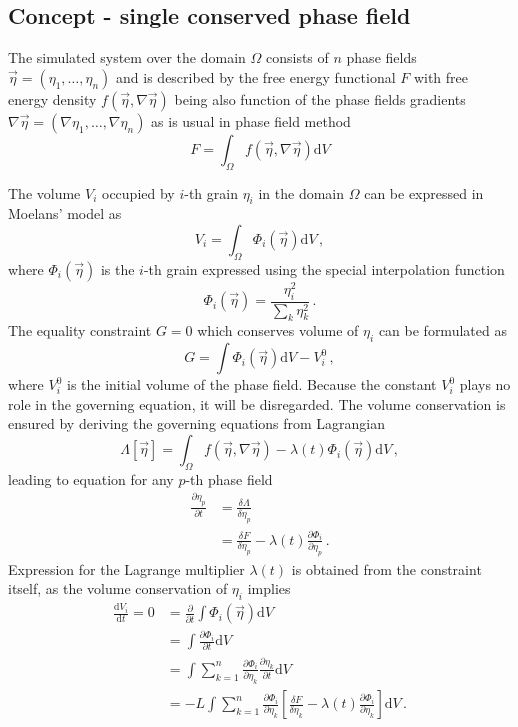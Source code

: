 \subsection*{Concept - single conserved phase field}
The simulated system over the domain $\Omega$ consists of $n$ phase fields $\vec{\eta}=(\eta_1,\dots,\eta_n)$ and is described by the free energy functional $F$ with free energy density $f(\vec{\eta},\nabla\vec{\eta})$ being also function of the phase fields gradients $\nabla\vec{\eta}=(\nabla\eta_1,\dots,\nabla\eta_n)$ as is usual in phase field method
\begin{equation}
	F= \int_\Omega f(\vec{\eta},\nabla\vec{\eta}) \mathrm{d}V    
\end{equation}

The volume $V_i$ occupied by $i$-th grain $\eta_i$ in the domain $\Omega$ can be expressed in Moelans' model as
\begin{equation}
	V_i = \int_\Omega \Phi_i(\vec{\eta}) \mathrm{d}V \,,
\end{equation}
where $\Phi_i(\vec{\eta})$ is the $i$-th grain expressed using the special interpolation function~\cite{Moelans2011}
\begin{equation}
	\Phi_i(\vec{\eta}) = \frac{\eta_i^2}{\sum_k\eta_k^2} \,.
\end{equation}
The equality constraint $G=0$ which conserves volume of $\eta_i$ can be formulated as
\begin{equation}
	G = \int \Phi_i(\vec{\eta}) \mathrm{d}V - V_i^0 \,,
\end{equation}
where $V_i^0$ is the initial volume of the phase field. Because the constant $V_i^0$ plays no role in the governing equation, it will be disregarded. The volume conservation is ensured by deriving the governing equations from Lagrangian 
\begin{equation}
	\Lambda[\vec{\eta}]= \int_\Omega f(\vec{\eta},\nabla\vec{\eta}) - \lambda(t)\Phi_i(\vec{\eta}) \mathrm{d}V \,,
\end{equation}
leading to equation for any $p$-th phase field
\begin{align}
	\frac{\partial \eta_p}{\partial t} &= \frac{\delta \Lambda}{\delta \eta_p} \\
	&= \frac{\delta F}{\delta \eta_p} - \lambda(t)\frac{\partial \Phi_i}{\partial \eta_p}\,.
\end{align}
Expression for the Lagrange multiplier $\lambda(t)$ is obtained from the constraint itself, as the volume conservation of $\eta_i$ implies
\begin{align}
	\frac{\mathrm{d} V_i}{\mathrm{d} t} = 0 &= \frac{\partial}{\partial t}\int \Phi_i(\vec{\eta}) \mathrm{d}V \label{eq_PFVC_Lagrm_vol_invarcond}\\
	&= \int \frac{\partial \Phi_i}{\partial t} \mathrm{d}V \\
	&= \int \sum_{k=1}^n\frac{\partial \Phi_i}{\partial \eta_k}\frac{\partial \eta_k}{\partial t} \mathrm{d}V \\
	&= -L\int \sum_{k=1}^n\frac{\partial \Phi_i}{\partial \eta_k}\left[ \frac{\delta F}{\delta \eta_k} - \lambda(t)\frac{\partial \Phi_i}{\partial \eta_k} \right] \mathrm{d}V \,.
\end{align}
